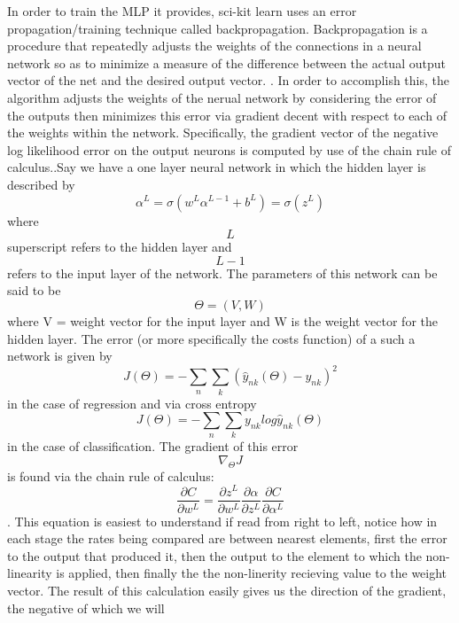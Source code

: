 In order to train the MLP it provides, sci-kit learn uses an error
propagation/training technique called backpropagation. Backpropagation
is a procedure that repeatedly adjusts the weights of the connections
in a neural network so as to minimize a measure of the difference
between the actual output vector of the net and the desired output
vector. \cite{Rumelhart}. In order to accomplish this, the algorithm
adjusts the weights of the nerual network by considering the error of
the outputs then minimizes this error via gradient decent with respect
to each of the weights within the network. Specifically, the gradient
vector of the negative log likelihood error on the output neurons is
computed by use of the chain rule of calculus.\cite{Murphy}.Say we
have a one layer neural network in which the hidden layer is described
by $$\alpha^{L} = \sigma(w^{L}\alpha^{L-1} + b^{L}) = \sigma(z^{L})$$
where $$L$$ superscript refers to the hidden layer and $$L-1$$ refers
to the input layer of the network. The parameters of this network can
be said to be $$\Theta = (V,W)$$ where V = weight vector for the input
layer and W is the weight vector for the hidden layer. The error (or
more specifically the costs function) of a such a network is given by $$J(\Theta ) =
- \sum_n\sum_k(\hat{y}_{nk}(\Theta)-y_{nk})^2$$ in the case of
regression and via cross entropy $$J(\Theta ) =
- \sum_n\sum_ky_{nk}log\hat{y}_{nk}(\Theta)$$ in the case of
classification. The gradient of this error $$\nabla_{\Theta}J$$ is
found via the chain rule of calculus: $$\frac{\partial C}{\partial
w^{L}} = \frac{\partial z^{L}}{\partial
w^{L}}\frac{\partial \alpha}{\partial z^{L}}\frac{\partial
C}{\partial \alpha^{L}}$$. This equation is easiest to understand if
read from right to left, notice how in each stage the rates being
compared are between nearest elements, first the error to the output
that produced it, then the output to the element to which the
non-linearity is applied, then finally the the non-linerity recieving
value to the weight vector. The result of this calculation easily
gives us the direction of the gradient, the negative of which we will
